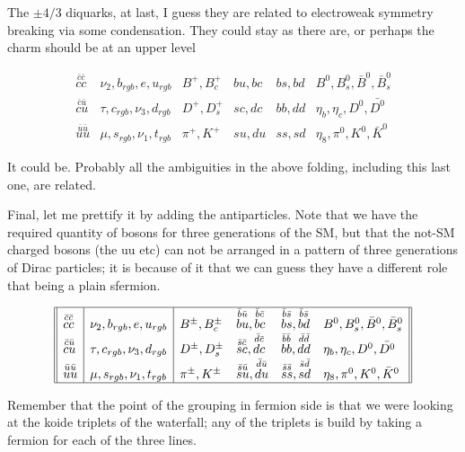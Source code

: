 \documentclass{article}
\begin{document}
The $\pm 4/3$ diquarks, at last, I guess they are related to 
electroweak symmetry breaking via some condensation. They could stay
as there are, or perhaps the charm should be at an upper level

$$
\begin{array}{lllllll} 
\stackrel{\bar c\bar c}{cc}&
\nu_2, b_{rgb}, e, u_{rgb}& 
      B^+,B_c^+ & 
      {bu}, {bc}
      &  {bs}, {bd} & 
       B^0, B^0_s,  \bar B^0, \bar B^0_s \\ 
\stackrel{\bar c\bar u}{cu}&
\tau, c_{rgb} , \nu_3,  d_{rgb}&
       D^+, D_s^+&
       sc,dc  & 
       bb,dd &
       \eta_b, \eta_c, D^0, \bar {D^0}\\ 
\stackrel{\bar u\bar u}{uu}&
\mu, s_{rgb} , \nu_1, t_{rgb}&
         \pi^+, K^+& 
         su, du&
         ss, sd&
         \eta_8, \pi^0, K^0, \bar K^0 
\end{array}
$$

It could be. Probably all the ambiguities in the above folding,
including this last one, are related.

Final, let me prettify it by adding the antiparticles. Note that we have the 
required quantity of bosons for three generations of the SM, but that
the not-SM charged bosons (the uu etc) can not be arranged in a
pattern of three generations of Dirac particles; it is because of it
that we can guess they have a different role that being
a plain sfermion.
 
$$
\begin{array}{||l|l|llll||} 
\hline
\stackrel{\bar c\bar c}{cc}&
\nu_2, b_{rgb}, e, u_{rgb}& 
      B^\pm,B_c^\pm & 
      \stackrel{\bar b\bar u}{bu}, \stackrel{\bar b\bar c}{bc}
      &  \stackrel{\bar b \bar s}{bs}, \stackrel{\bar b\bar s}{bd} & 
       B^0, B^0_s,  \bar B^0, \bar B^0_s \\ 
\stackrel{\bar c\bar u}{cu}&
\tau, c_{rgb} , \nu_3,  d_{rgb}&
       D^\pm, D_s^\pm&
       \stackrel{\bar s\bar c}{sc},\stackrel{\bar d\bar c}{dc}  & 
       \stackrel{\bar b\bar b}{bb},\stackrel{\bar d\bar d}{dd} &
       \eta_b, \eta_c, D^0, \bar {D^0}\\ 
\stackrel{\bar u\bar u}{uu}&
\mu, s_{rgb} , \nu_1, t_{rgb}&
         \pi^\pm, K^\pm& 
         \stackrel{\bar s\bar u}{su}, \stackrel{\bar d\bar u}{du}&
         \stackrel{\bar s\bar s}{ss}, \stackrel{\bar s\bar d}{sd}&
         \eta_8, \pi^0, K^0, \bar K^0 \\
\hline
\end{array}
$$

Remember that the point of the grouping in fermion side is that we were
looking at the koide triplets of the waterfall; any of the triplets
is build by taking a fermion for each of the three lines.
\end{document}
